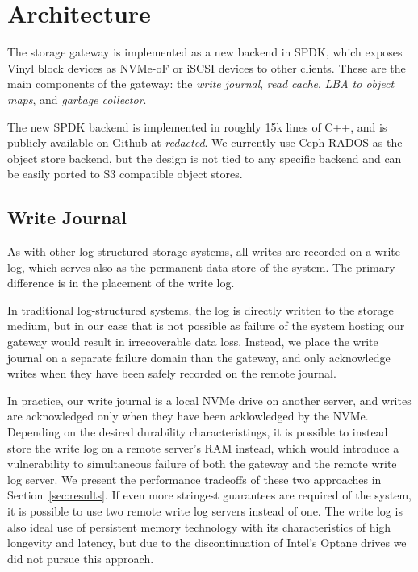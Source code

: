 \section{Architecture} \label{sec:architecture}

The storage gateway is implemented as a new backend in SPDK, which exposes
Vinyl block devices as NVMe-oF or iSCSI devices to other clients. These are the
main components of the gateway: the \textit{write journal}, \textit{read cache},
\textit{LBA to object maps}, and \textit{garbage collector}.

The new SPDK backend is implemented in roughly 15k lines of C++, and is publicly
available on Github at \textit{redacted}. We currently use Ceph RADOS as the
object store backend, but the design is not tied to any specific backend and
can be easily ported to S3 compatible object stores.

\subsection{Write Journal}

As with other log-structured storage systems, all writes are recorded on a
write log, which serves also as the permanent data store of the system. The
primary difference is in the placement of the write log.

In traditional log-structured systems, the log is directly written to the
storage medium, but in our case that is not possible as failure of the system
hosting our gateway would result in irrecoverable data loss. Instead, we
place the write journal on a separate failure domain than the gateway, and only
acknowledge writes when they have been safely recorded on the remote journal.

In practice, our write journal is a local NVMe drive on another server, and
writes are acknowledged only when they have been acklowledged by the NVMe.
Depending on the desired durability characteristings, it is possible to instead
store the write log on a remote server's RAM instead, which would introduce a
vulnerability to simultaneous failure of both the gateway and the remote write
log server. We present the performance tradeoffs of these two approaches in
Section~\ref{sec:results}. If even more stringest guarantees are required of the
system, it is possible to use two remote write log servers instead of one. The
write log is also ideal use of persistent memory technology with its
characteristics of high longevity and latency, but due to the discontinuation of
Intel's Optane drives we did not pursue this approach.

